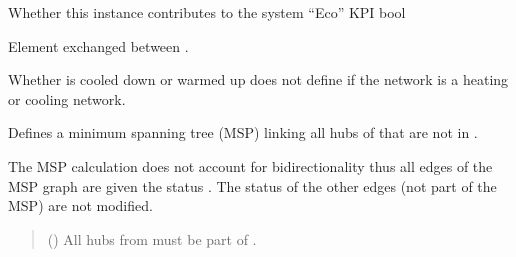 \documentclass[letterpaper,10pt,english]{sphinxmanual}
\begin{document}
\begin{fulllineitems}
\begin{fulllineitems}
\end{fulllineitems}


\begin{fulllineitems}
\label{\detokenize{generated/tamos.network.NonThermalNetwork:tamos.network.NonThermalNetwork.eco_count}}
\pysigstartsignatures
{}
\pysigstopsignatures
\sphinxAtStartPar
Whether this instance contributes to the system “Eco” KPI
bool

\end{fulllineitems}


\begin{fulllineitems}
\label{\detokenize{generated/tamos.network.NonThermalNetwork:tamos.network.NonThermalNetwork.element}}
\pysigstartsignatures
{}
\pysigstopsignatures
\sphinxAtStartPar
Element exchanged between .

\sphinxAtStartPar
Whether  is cooled down or warmed up does not define if the network is a heating or cooling network.

\end{fulllineitems}


\begin{fulllineitems}
\label{\detokenize{generated/tamos.network.NonThermalNetwork:tamos.network.NonThermalNetwork.generate_MSP}}
\pysigstartsignatures
{}
\pysigstopsignatures
\sphinxAtStartPar
Defines a minimum spanning tree (MSP) linking all hubs of  that are not in .

\sphinxAtStartPar
The MSP calculation does not account for bidirectionality thus all edges of the MSP graph are given
the status .
The status of the other edges (not part of the MSP) are not modified.
\begin{quote}\begin{description}
\sphinxAtStartPar
{} (\sphinxstyleliteralemphasis{\sphinxupquote{, }}) \textendash{} All hubs from  must be part of .


\end{description}
\end{quote}
\end{fulllineitems}
\end{fulllineitems}
\end{document}
